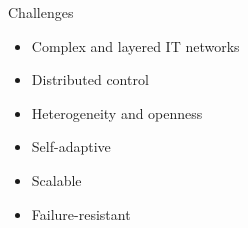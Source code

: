\begin{frame}{Challenges}
  \begin{cardTiny}
    \begin{itemize}
      \item Complex and layered IT networks
      \item Distributed control
      \item Heterogeneity and openness
    \end{itemize}
  \end{cardTiny}
  \begin{card}
    \begin{itemize}
      \item[\success{\faThumbsUp}] Self-adaptive
      \item[\success{\faThumbsUp}] Scalable
      \item[\success{\faThumbsUp}] Failure-resistant
    \end{itemize}
  \end{card}
\end{frame}